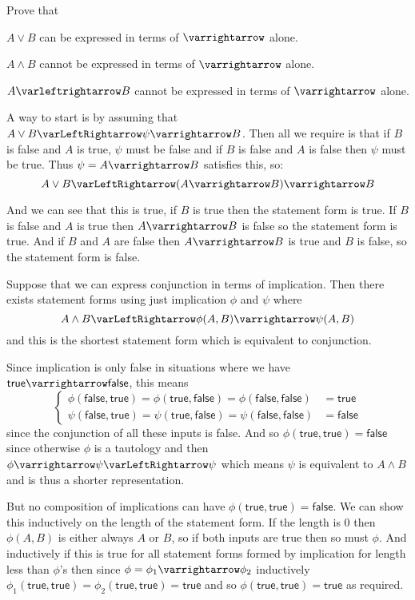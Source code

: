 \documentclass[10pt]{article}
\let\eiff=\varLeftRightarrow
\let\to=\varrightarrow
\let\oto=\varleftrightarrow
\def\true{\mathsf{true}}
\def\false{\mathsf{false}}
\begin{document}
\begin{exercise*}

    Prove that
    \benum
        \item $A\lor B$ can be expressed in terms of $\to$ alone.
        \item $A\land B$ cannot be expressed in terms of $\to$ alone.
        \item $A\oto B$ cannot be expressed in terms of $\to$ alone.
    \eenum

\end{exercise*}

\begin{blankpp}

    \benum
        \item A way to start is by assuming that $A\lor B\eiff \psi\to B$.
        Then all we require is that if $B$ is false and $A$ is true, $\psi$ must be false and if $B$ is false and $A$ is false then $\psi$ must be true.
        Thus $\psi=A\to B$ satisfies this, so:
        \[ A\lor B\eiff(A\to B)\to B \]

        And we can see that this is true, if $B$ is true then the statement form is true.
        If $B$ is false and $A$ is true then $A\to B$ is false so the statement form is true.
        And if $B$ and $A$ are false then $A\to B$ is true and $B$ is false, so the statement form is false.

        \item Suppose that we can express conjunction in terms of implication.
        Then there exists statement forms using just implication $\phi$ and $\psi$ where
        \[ A\land B \eiff \phi(A,B)\to\psi(A,B) \]
        and this is the shortest statement form which is equivalent to conjunction.

        Since implication is only false in situations where we have $\true\to\false$, this means
        \[ \left\{\begin{aligned} \phi(\false,\true)=\phi(\true,\false)=\phi(\false,\false) &= \true \\ \psi(\false,\true)=\psi(\true,\false)=\psi(\false,\false) &= \false \end{aligned}\right. \]
        since the conjunction of all these inputs is false.
        And so $\phi(\true,\true)=\false$ since otherwise $\phi$ is a tautology and then $\phi\to\psi\eiff\psi$ which means $\psi$ is equivalent to $A\land B$ and is thus a shorter representation.

        But no composition of implications can have $\phi(\true,\true)=\false$.
        We can show this inductively on the length of the statement form.
        If the length is $0$ then $\phi(A,B)$ is either always $A$ or $B$, so if both inputs are true then so must $\phi$.
        And inductively if this is true for all statement forms formed by implication for length less than $\phi$'s then since $\phi=\phi_1\to\phi_2$ inductively
        $\phi_1(\true,\true)=\phi_2(\true,\true)=\true$ and so $\phi(\true,\true)=\true$ as required.


\end{blankpp}
\end{document}
